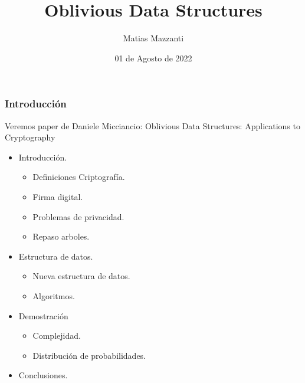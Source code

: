 \documentclass[10pt,handout]{beamer}
\title[Algoritmos y estructuras de datos 2]{Oblivious Data Structures}
\author[Matias Mazzanti]{Matias Mazzanti}
\institute{DC-UBA}
\date{01 de Agosto de 2022}
\begin{document}
\begin{frame}

\maketitle

\end{frame}
\section{}
\begin{frame}
\frametitle{Introducción}
\begin{mdframed}[backgroundcolor=frenchblue!20]
 Veremos paper de Daniele Micciancio: Oblivious Data Structures: Applications to Cryptography
\end{mdframed}
\begin{itemize}\itemsep-1em
   \item Introducción.
     \vspace{-0.3cm}
  \begin{itemize}\itemsep-1em
     \item Definiciones Criptografía.
      \item Firma digital.
      \item Problemas de privacidad.
      \item Repaso arboles.
  \end{itemize}
\item Estructura de datos.
     \vspace{-0.3cm}
  \begin{itemize}\itemsep-1em
      \item Nueva estructura de datos.
      \item Algoritmos.
  \end{itemize}
  \item Demostración
     \vspace{-0.3cm}
  \begin{itemize}\itemsep-1em
     \item Complejidad.
    \item Distribución de probabilidades.
  \end{itemize}
    \item Conclusiones.
\end{itemize}
\end{frame}
\end{document}
